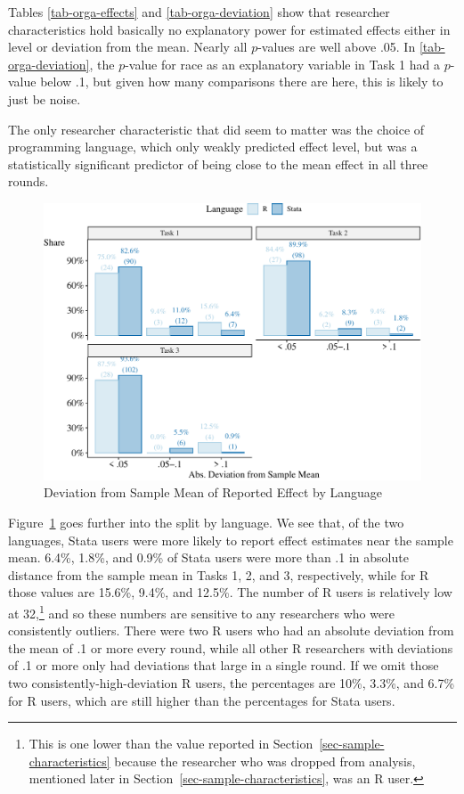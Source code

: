 \documentclass[
  letterpaper,
  DIV=11,
  numbers=noendperiod]{scrartcl}
\begin{document}
Tables \ref{tab-orga-effects} and \ref{tab-orga-deviation} show that
researcher characteristics hold basically no explanatory power for
estimated effects either in level or deviation from the mean. Nearly all
\(p\)-values are well above .05. In \ref{tab-orga-deviation}, the
\(p\)-value for race as an explanatory variable in Task 1 had a
\(p\)-value below .1, but given how many comparisons there are here,
this is likely to just be noise.

The only researcher characteristic that did seem to matter was the
choice of programming language, which only weakly predicted effect
level, but was a statistically significant predictor of being close to
the mean effect in all three rounds.

\begin{figure}

{\centering \includegraphics{The-Sources-of-Researcher-Variation-in-Economics_files/figure-pdf/fig-deviations-by-language-1.pdf}

}

\caption{\label{fig-deviations-by-language}Deviation from Sample Mean of
Reported Effect by Language}

\end{figure}

Figure~\ref{fig-deviations-by-language} goes further into the split by
language. We see that, of the two languages, Stata users were more
likely to report effect estimates near the sample mean. 6.4\%, 1.8\%,
and 0.9\% of Stata users were more than .1 in absolute distance from the
sample mean in Tasks 1, 2, and 3, respectively, while for R those values
are 15.6\%, 9.4\%, and 12.5\%. The number of R users is relatively low
at 32,\footnote{This is one lower than the value reported in
  Section~\ref{sec-sample-characteristics} because the researcher who
  was dropped from analysis, mentioned later in
  Section~\ref{sec-sample-characteristics}, was an R user.} and so these
numbers are sensitive to any researchers who were consistently outliers.
There were two R users who had an absolute deviation from the mean of .1
or more every round, while all other R researchers with deviations of .1
or more only had deviations that large in a single round. If we omit
those two consistently-high-deviation R users, the percentages are 10\%,
3.3\%, and 6.7\% for R users, which are still higher than the
percentages for Stata users.
\end{document}
